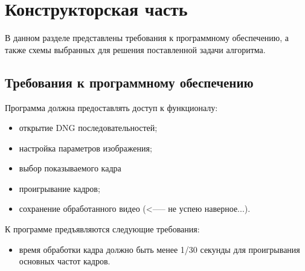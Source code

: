 \chapter{Конструкторская часть}

В данном разделе представлены требования к программному обеспечению, а также схемы выбранных для решения поставленной задачи алгоритма.

\section{Требования к программному обеспечению}

Программа должна предоставлять доступ к функционалу:
\begin{itemize}
	\item открытие DNG последовательностей;
	\item настройка параметров изображения;
	\item выбор показываемого кадра
	\item проигрывание кадров;
	\item сохранение обработанного видео (<----- не успею наверное...).
\end{itemize}

К программе предъявляются следующие требования:
\begin{itemize}
	\item время обработки кадра должно быть менее 1/30 секунды для проигрывания основных частот кадров.
\end{itemize}

